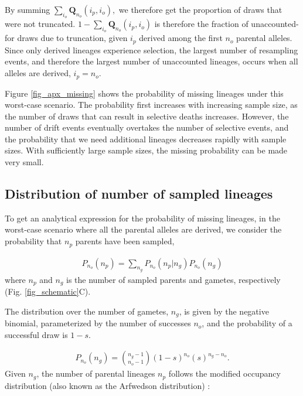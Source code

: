 \documentclass[review]{elsarticle}
\begin{document}
By summing $\sum_{i_o} \mathbf{Q}_{n_o}(i_p, i_o),$ we therefore get the proportion of draws that
were not truncated. $1-\sum_{i_o} \mathbf{Q}_{n_o}(i_p, i_o)$ is therefore the fraction of
unaccounted-for draws due to truncation, given $i_p$ derived among the first $n_o$ parental
alleles. Since only derived lineages experience selection, the largest number of resampling events,
and therefore the largest number of unaccounted lineages, occurs when all alleles are derived,
$i_p = n_o$.

Figure \ref{fig_apx_missing} shows the probability of missing lineages under this worst-case scenario. The 
probability first increases with increasing sample size, as the number of draws that can
result in selective deaths increases. However, the number of drift events eventually overtakes the
number of selective events, and the probability that we need additional lineages decreases rapidly
with sample sizes. With sufficiently large sample sizes, the missing probability can be made very small.

\subsection{Distribution of number of sampled lineages}
\label{subsec_distribution}

To get an analytical expression for the probability of missing lineages, in the worst-case scenario
where all the parental alleles are derived, we consider the probability that $n_p$ parents have been
sampled,

\begin{equation}
  \begin{aligned}
    \label{eq_conditional}
    P_{n_o}(n_p) = \sum_{n_g} P_{n_o}(n_p | n_g)P_{n_o}(n_g) 
  \end{aligned}
\end{equation}
where $n_p$ and $n_g$ is the number of sampled parents and gametes, respectively (Fig.
\ref{fig_schematic}C). 

The distribution over the number of gametes, $n_g$, is given by the negative binomial,
parameterized by the number of successes $n_o$, and the probability of a successful draw is $1-s$.

\begin{equation}
  \begin{aligned}
    \label{eq_neg_binomial_trials}
    P_{n_o}(n_g) = \binom{n_g-1}{n_o-1}(1-s)^{n_o}(s)^{n_g-n_o}.
  \end{aligned}
\end{equation}
Given $n_g$, the number of parental lineages $n_p$ follows the modified occupancy distribution
(also known as the Arfwedson distribution) \citep{Wakeley2009,ONeill2019,JohnsonEtAl2005}: 
\end{document}
